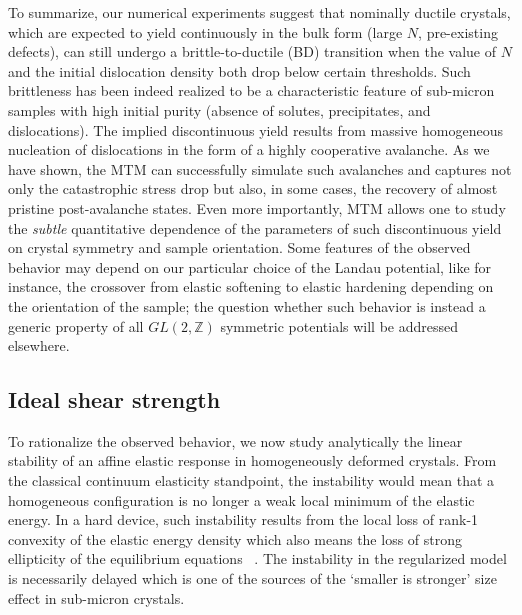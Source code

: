 \documentclass[CRPHYS,Unicode,manuscript]{cedram}
\begin{document}
To summarize, our numerical experiments suggest that nominally ductile crystals, which are expected to  yield continuously in the bulk form (large $N$, pre-existing defects), can still undergo a brittle-to-ductile (BD) transition when the value of $N$ and the initial dislocation density both drop below certain thresholds. Such brittleness has been indeed  realized to be a characteristic feature of sub-micron samples with high initial purity (absence of solutes, precipitates, and dislocations).  The implied discontinuous yield results from massive homogeneous nucleation of dislocations in the form of a highly cooperative avalanche. As we have shown,  the MTM can successfully simulate such avalanches and captures not only the  catastrophic stress drop but also, in some cases,  the recovery of almost pristine post-avalanche states. Even more importantly, MTM allows one to study the \emph{subtle} quantitative dependence of the parameters of such discontinuous yield on crystal symmetry and sample orientation.  Some features of the observed behavior may depend on our particular  choice of the  Landau  potential, like for instance, the  crossover from elastic softening to elastic hardening depending on the orientation of the sample; the question whether such  behavior is instead a generic property of all $GL(2,\mathbb Z)$ symmetric potentials will be addressed elsewhere. 





\subsection{Ideal shear strength}
 
To rationalize the observed behavior,  we  now  study  analytically the  linear  stability  of  an affine elastic response  in  homogeneously deformed  crystals.  From  the    classical continuum elasticity  standpoint,  the  instability would mean  that a homogeneous configuration is no longer   a weak local minimum of the elastic energy. In  a hard device,  such instability results  from the local loss  of   rank-1 convexity of the elastic energy density which also means  the  loss of strong ellipticity of the  equilibrium equations ~\cite{ogden_nl,Grabovsky2014-fb}. The instability in  the regularized  model is necessarily  delayed which is one of the  sources of the `smaller is stronger' size effect in sub-micron crystals. 
\end{document}
